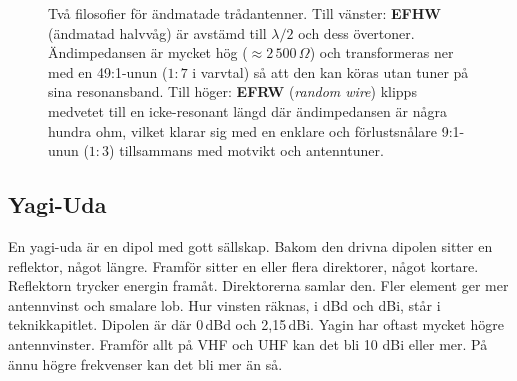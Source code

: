 \begin{figure}[H]
\caption{Två filosofier för ändmatade trådantenner. Till vänster: \textbf{EFHW}
(ändmatad halvvåg) är avstämd till $\lambda/2$ och dess övertoner. Ändimpedansen
är mycket hög ($\approx 2\,500\,\Omega$) och transformeras ner med en 49:1-unun
($1{:}7$ i varvtal) så att den kan köras utan tuner på sina resonansband. Till
höger: \textbf{EFRW} (\textit{random wire}) klipps medvetet till en icke-resonant
längd där ändimpedansen är några hundra ohm, vilket klarar sig med en enklare
och förlustsnålare 9:1-unun ($1{:}3$) tillsammans med motvikt och antenntuner.}
\label{fig:efhw-efrw}
\end{figure}

\subsection{Yagi-Uda}

En yagi-uda är en dipol med gott sällskap. Bakom den drivna dipolen
sitter en reflektor, något längre. Framför sitter en eller flera
direktorer, något kortare. Reflektorn trycker energin
framåt. Direktorerna samlar den.  Fler element ger mer antennvinst och
smalare lob. Hur vinsten räknas, i dBd och dBi, står i
teknikkapitlet. Dipolen är där 0\,dBd och 2,15\,dBi. Yagin har oftast
mycket högre antennvinster. Framför allt på VHF och UHF kan det bli 10
dBi eller mer. På ännu högre frekvenser kan det bli mer än så.

